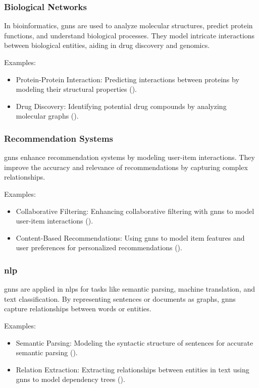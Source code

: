 \subsubsection*{Biological Networks}

In bioinformatics, \glspl{gnn} are used to analyze molecular structures, predict protein functions, and understand biological processes. They model intricate interactions between biological entities, aiding in drug discovery and genomics.

Examples:
\begin{itemize}
    \item Protein-Protein Interaction: Predicting interactions between proteins by modeling their structural properties (\cite{Fout2017}).
    \item Drug Discovery: Identifying potential drug compounds by analyzing molecular graphs (\cite{Jin2018}).
\end{itemize}

\subsubsection*{Recommendation Systems}

\glspl{gnn} enhance recommendation systems by modeling user-item interactions. They improve the accuracy and relevance of recommendations by capturing complex relationships.

Examples:
\begin{itemize}
    \item Collaborative Filtering: Enhancing collaborative filtering with \glspl{gnn} to model user-item interactions (\cite{Wang2019}).
    \item Content-Based Recommendations: Using \glspl{gnn} to model item features and user preferences for personalized recommendations (\cite{Ying2018}).
\end{itemize}


\subsubsection*{\acrlong{nlp}}

\glspl{gnn} are applied in \glspl{nlp} for tasks like semantic parsing, machine translation, and text classification. By representing sentences or documents as graphs, \glspl{gnn} capture relationships between words or entities.

Examples:
\begin{itemize}
    \item Semantic Parsing: Modeling the syntactic structure of sentences for accurate semantic parsing (\cite{Zeng2019}).
    \item Relation Extraction: Extracting relationships between entities in text using \glspl{gnn} to model dependency trees (\cite{Sahu2019}).
\end{itemize}

